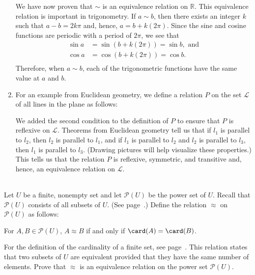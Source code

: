 \begin{enumerate}
We have now proven that  $\sim$  is an equivalence relation on  $\mathbb{R}$.  This equivalence relation is important in trigonometry.  If   $a \sim b$, then there exists an integer  $k$  such that  $a - b = 2k\pi $ and, hence,  $a = b + k( {2\pi } )$.  Since the sine and cosine functions are periodic with a period of  $2\pi $, we see that
\[
\begin{aligned}
  \sin a &= \sin( {b + k( {2\pi } )} ) = \sin b,\text{ and} \\ 
  \cos a &= \cos( {b + k( {2\pi } )} ) = \cos b. \\ 
\end{aligned} 
\]
Therefore, when  $a \sim b$, each of the trigonometric functions have the same value at  $a$  and  $b$.

\item For an example from Euclidean geometry, we define a relation  $P$  on the set  $\mathcal{L}$ of all lines in the plane as follows:


We added the second condition to the definition of  $P$  to ensure that  $P$  is reflexive on  $\mathcal{L}$.  Theorems from Euclidean geometry tell us that if  $l_1 $  is parallel to  $l_2 $, then  $l_2 $  is parallel to  $l_1 $, and if $l_1 $  is parallel to  $l_2 $ and  $l_2 $  is parallel to  $l_3 $, then  $l_1 $  is parallel to  $l_3 $.  (Drawing pictures will help visualize these properties.)  This tells us that the relation  $P$  is reflexive, symmetric, and transitive and, hence, an equivalence relation on  $\mathcal{L}$.
\end{enumerate}
\hbreak

\begin{prog} \label{prog:anotherequiv} \hfill \\
Let  $U$  be a finite, nonempty set and let  $\mathcal{P}\left( U \right)$ be the power set of  $U$.  Recall that $\mathcal{P}\left( U \right)$ consists of all subsets of $U$. (See page~\pageref{D:powerset}.)   Define the relation  $ \approx $  on  $\mathcal{P}\left( U \right)$  as follows:

\begin{center}
For  $A, B \in \mathcal{P}\left( U \right)$,  $A \approx B$  if and only if  
$\card(A) = \card(B)$.
\end{center}
For the definition of the cardinality of a finite set, see page~\pageref{D:cardinality}.  This relation states that two subsets of $U$  are equivalent provided that they have the same number of elements. Prove that 
$\approx$ is an equivalence relation on the power set $\mathcal{P}\left( U \right)$.
\end{prog}

\endinput
